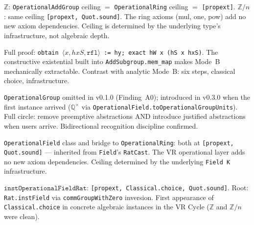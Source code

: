 \begin{finding}
\label{finding:A10}
\leanok
{}
$\mathbb{Z}$: \texttt{OperationalAddGroup} ceiling $=$ \texttt{OperationalRing}
ceiling $=$ \texttt{[propext]}.
$\mathbb{Z}/n$: same ceiling \texttt{[propext, Quot.sound]}.
The ring axioms (mul, one, pow) add no new axiom dependencies.
Ceiling is determined by the underlying type's infrastructure, not algebraic
depth.
\end{finding}

\begin{finding}[A11 --- Algebraic Mode~B = one proof step]
\label{finding:A11}
\leanok
{}
Full proof: \texttt{obtain $\langle x, hxS, \texttt{rfl}\rangle$ := hy;
exact hW x (hS x hxS)}.  The constructive existential built into
\texttt{AddSubgroup.mem\_map} makes Mode~B mechanically extractable.
Contrast with analytic Mode~B: six steps, classical choice, infrastructure.
\end{finding}

\begin{finding}
\label{finding:A12}
\leanok
{}
\texttt{OperationalGroup} omitted in v0.1.0 (Finding~A0); introduced in
v0.3.0 when the first instance arrived ($\mathbb{Q}^\times$ via
\texttt{OperationalField.toOperationalGroupUnits}).  Full circle:
remove preemptive abstractions AND introduce justified abstractions
when users arrive.  Bidirectional recognition discipline confirmed.
\end{finding}

\begin{finding}
\label{finding:A13}
\leanok
{}
\texttt{OperationalField} class and bridge to \texttt{OperationalRing}: both
at \texttt{[propext, Quot.sound]} --- inherited from \texttt{Field}'s
\texttt{RatCast}.  The VR operational layer adds no new axiom dependencies.
Ceiling determined by the underlying \texttt{Field K} infrastructure.
\end{finding}

\begin{finding}
\label{finding:A14}
\leanok
{}
$\texttt{instOperationalFieldRat}$:
\texttt{[propext, Classical.choice, Quot.sound]}.
Root: \texttt{Rat.instField} via \texttt{commGroupWithZero} inversion.
First appearance of \texttt{Classical.choice} in concrete algebraic
instances in the VR Cycle ($\mathbb{Z}$ and $\mathbb{Z}/n$ were clean).
\end{finding}

